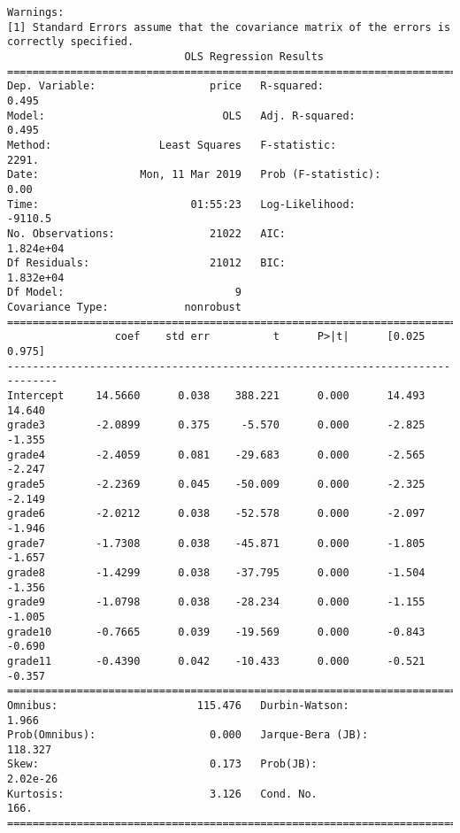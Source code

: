 \documentclass[11pt]{article}
\begin{document}
\begin{Verbatim}[commandchars=\\\{\}]
Warnings:
[1] Standard Errors assume that the covariance matrix of the errors is correctly specified.
                            OLS Regression Results                            
==============================================================================
Dep. Variable:                  price   R-squared:                       0.495
Model:                            OLS   Adj. R-squared:                  0.495
Method:                 Least Squares   F-statistic:                     2291.
Date:                Mon, 11 Mar 2019   Prob (F-statistic):               0.00
Time:                        01:55:23   Log-Likelihood:                -9110.5
No. Observations:               21022   AIC:                         1.824e+04
Df Residuals:                   21012   BIC:                         1.832e+04
Df Model:                           9                                         
Covariance Type:            nonrobust                                         
==============================================================================
                 coef    std err          t      P>|t|      [0.025      0.975]
------------------------------------------------------------------------------
Intercept     14.5660      0.038    388.221      0.000      14.493      14.640
grade3        -2.0899      0.375     -5.570      0.000      -2.825      -1.355
grade4        -2.4059      0.081    -29.683      0.000      -2.565      -2.247
grade5        -2.2369      0.045    -50.009      0.000      -2.325      -2.149
grade6        -2.0212      0.038    -52.578      0.000      -2.097      -1.946
grade7        -1.7308      0.038    -45.871      0.000      -1.805      -1.657
grade8        -1.4299      0.038    -37.795      0.000      -1.504      -1.356
grade9        -1.0798      0.038    -28.234      0.000      -1.155      -1.005
grade10       -0.7665      0.039    -19.569      0.000      -0.843      -0.690
grade11       -0.4390      0.042    -10.433      0.000      -0.521      -0.357
==============================================================================
Omnibus:                      115.476   Durbin-Watson:                   1.966
Prob(Omnibus):                  0.000   Jarque-Bera (JB):              118.327
Skew:                           0.173   Prob(JB):                     2.02e-26
Kurtosis:                       3.126   Cond. No.                         166.
==============================================================================


\end{Verbatim}
\end{document}
